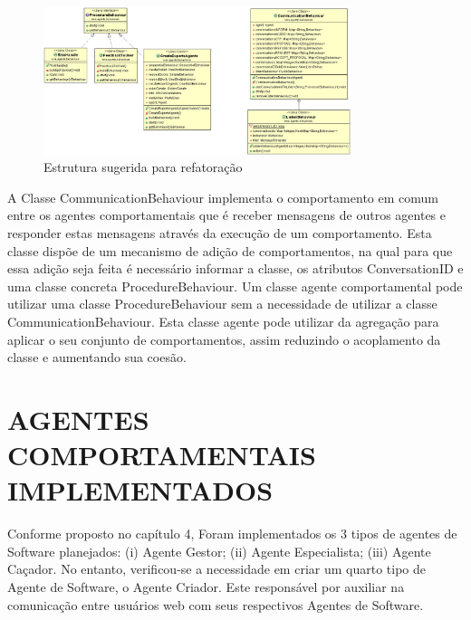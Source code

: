 \begin{figure}[h]
\centering
\label{f35}
\includegraphics[width=0.8\textwidth]{figuras/pacoteBehaviours}
\caption{Estrutura sugerida para refatoração}
\end{figure}

A Classe CommunicationBehaviour implementa o comportamento em comum entre os agentes comportamentais que é receber mensagens de outros agentes e responder estas mensagens através da execução de um comportamento. Esta classe dispõe de um mecanismo de adição de comportamentos, na qual para que essa adição seja feita é necessário informar a classe, os atributos ConversationID e uma classe concreta ProcedureBehaviour. Um classe agente comportamental pode utilizar uma classe ProcedureBehaviour sem a necessidade de utilizar a classe CommunicationBehaviour. Esta classe agente pode utilizar da agregação para aplicar o seu conjunto de comportamentos, assim reduzindo o acoplamento da classe e aumentando sua coesão.

\section{AGENTES COMPORTAMENTAIS IMPLEMENTADOS}

Conforme proposto no capítulo 4, Foram implementados os 3 tipos de agentes de Software planejados: (i) Agente Gestor; (ii) Agente Especialista; (iii) Agente Caçador. No entanto, verificou-se a necessidade em criar um quarto tipo de Agente de Software, o Agente Criador. Este responsável por auxiliar na comunicação entre usuários web com seus respectivos Agentes de Software. 

